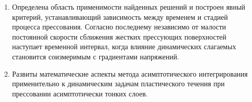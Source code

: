 \begin{enumerate}
  \item Определена область применимости найденных решений и построен явный критерий, устанавливающий зависимость между временем и стадией процесса прессования. Согласно последнему независимо от малости постоянной скорости сближения жестких прессующих поверхностей наступает временной интервал, когда влияние динамических слагаемых становится соизмеримым с градиентами напряжений.
  \item Развиты математические аспекты метода асимптотического интегрирования применительно к динамическим задачам пластического течения при прессовании асимптотически тонких слоев.
\end{enumerate}
